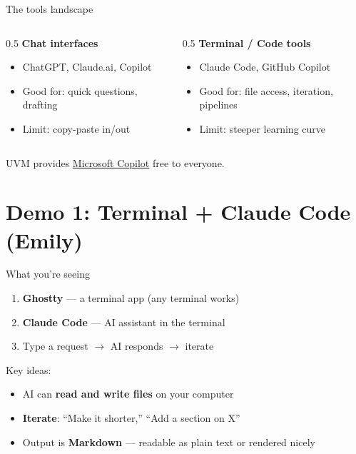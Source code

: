 \documentclass[aspectratio=169]{beamer}
\begin{document}
\begin{frame}{The tools landscape}
\begin{columns}
\begin{column}{0.5\textwidth}
\textbf{Chat interfaces}
\begin{itemize}
    \item ChatGPT, Claude.ai, Copilot
    \item Good for: quick questions, drafting
    \item Limit: copy-paste in/out
\end{itemize}
\end{column}
\begin{column}{0.5\textwidth}
\textbf{Terminal / Code tools}
\begin{itemize}
    \item Claude Code, GitHub Copilot
    \item Good for: file access, iteration, pipelines
    \item Limit: steeper learning curve
\end{itemize}
\end{column}
\end{columns}

\bigskip
UVM provides \href{https://go.uvm.edu/copilot}{Microsoft Copilot} free to everyone.
\end{frame}

\section{Demo 1: Terminal + Claude Code (Emily)}

\begin{frame}{What you're seeing}
\begin{enumerate}
    \item \textbf{Ghostty} --- a terminal app (any terminal works)
    \item \textbf{Claude Code} --- AI assistant in the terminal
    \item Type a request $\rightarrow$ AI responds $\rightarrow$ iterate
\end{enumerate}

\bigskip
Key ideas:
\begin{itemize}
    \item AI can \textbf{read and write files} on your computer
    \item \textbf{Iterate}: ``Make it shorter,'' ``Add a section on X''
    \item Output is \textbf{Markdown} --- readable as plain text or rendered nicely
\end{itemize}
\end{frame}
\end{document}
